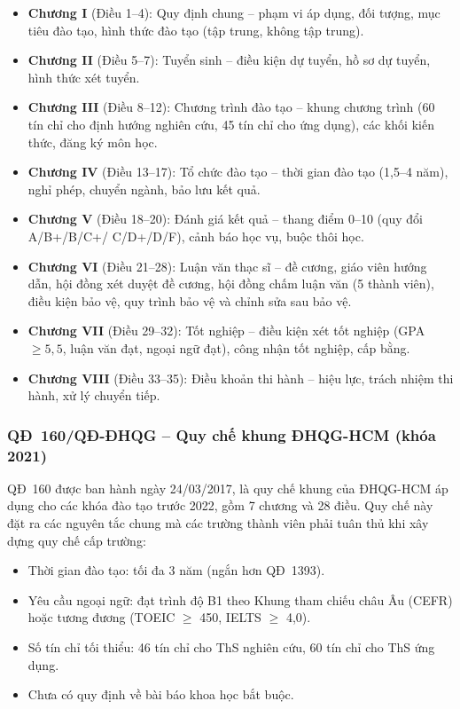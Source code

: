\begin{sloppypar}
\begin{itemize}
  \item \textbf{Chương I} (Điều 1--4): Quy định chung -- phạm vi áp dụng, đối
        tượng, mục tiêu đào tạo, hình thức đào tạo (tập trung, không tập trung).
  \item \textbf{Chương II} (Điều 5--7): Tuyển sinh -- điều kiện dự tuyển, hồ sơ
        dự tuyển, hình thức xét tuyển.
  \item \textbf{Chương III} (Điều 8--12): Chương trình đào tạo -- khung chương
        trình (60 tín chỉ cho định hướng nghiên cứu, 45 tín chỉ cho ứng dụng),
        các khối kiến thức, đăng ký môn học.
  \item \textbf{Chương IV} (Điều 13--17): Tổ chức đào tạo -- thời gian đào tạo
        (1,5--4 năm), nghỉ phép, chuyển ngành, bảo lưu kết quả.
  \item \textbf{Chương V} (Điều 18--20): Đánh giá kết quả -- thang điểm 0--10
        (quy đổi A/\allowbreak B+/\allowbreak B/\allowbreak C+/\allowbreak
        C/\allowbreak D+/\allowbreak D/\allowbreak F), cảnh báo học vụ, buộc thôi học.
  \item \textbf{Chương VI} (Điều 21--28): Luận văn thạc sĩ -- đề cương, giáo
        viên hướng dẫn, hội đồng xét duyệt đề cương, hội đồng chấm luận văn
        (5 thành viên), điều kiện bảo vệ, quy trình bảo vệ và chỉnh sửa sau
        bảo vệ.
  \item \textbf{Chương VII} (Điều 29--32): Tốt nghiệp -- điều kiện xét tốt
        nghiệp (GPA~$\geq 5{,}5$, luận văn đạt, ngoại ngữ đạt), công nhận tốt
        nghiệp, cấp bằng.
  \item \textbf{Chương VIII} (Điều 33--35): Điều khoản thi hành -- hiệu lực,
        trách nhiệm thi hành, xử lý chuyển tiếp.
\end{itemize}
\end{sloppypar}

\subsubsection*{QĐ~160/QĐ-ĐHQG -- Quy chế khung ĐHQG-HCM (khóa 2021)}

QĐ~160 được ban hành ngày 24/03/2017, là quy chế khung của ĐHQG-HCM áp dụng cho
các khóa đào tạo trước 2022, gồm 7 chương và 28 điều. Quy chế này đặt ra các
nguyên tắc chung mà các trường thành viên phải tuân thủ khi xây dựng quy chế cấp
trường:

\begin{itemize}
  \item Thời gian đào tạo: tối đa 3 năm (ngắn hơn QĐ~1393).
  \item Yêu cầu ngoại ngữ: đạt trình độ B1 theo Khung tham chiếu châu Âu (CEFR)
        hoặc tương đương (TOEIC $\geq$ 450, IELTS $\geq$ 4,0).
  \item Số tín chỉ tối thiểu: 46 tín chỉ cho ThS nghiên cứu, 60 tín chỉ cho ThS
        ứng dụng.
  \item Chưa có quy định về bài báo khoa học bắt buộc.
\end{itemize}

